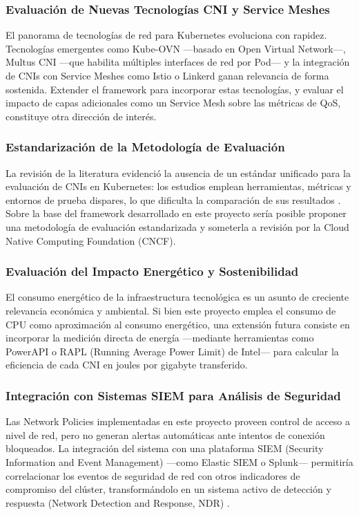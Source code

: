 \subsubsection{Evaluación de Nuevas Tecnologías CNI y Service Meshes}

El panorama de tecnologías de red para Kubernetes evoluciona con rapidez. Tecnologías emergentes como Kube-OVN ---basado en Open Virtual Network---, Multus CNI ---que habilita múltiples interfaces de red por Pod--- y la integración de CNIs con Service Meshes como Istio o Linkerd ganan relevancia de forma sostenida. Extender el framework para incorporar estas tecnologías, y evaluar el impacto de capas adicionales como un Service Mesh sobre las métricas de QoS, constituye otra dirección de interés.

\subsubsection{Estandarización de la Metodología de Evaluación}

La revisión de la literatura evidenció la ausencia de un estándar unificado para la evaluación de CNIs en Kubernetes: los estudios emplean herramientas, métricas y entornos de prueba dispares, lo que dificulta la comparación de sus resultados \cite{ref7,ref8}. Sobre la base del framework desarrollado en este proyecto sería posible proponer una metodología de evaluación estandarizada y someterla a revisión por la Cloud Native Computing Foundation (CNCF).

\subsubsection{Evaluación del Impacto Energético y Sostenibilidad}

El consumo energético de la infraestructura tecnológica es un asunto de creciente relevancia económica y ambiental. Si bien este proyecto emplea el consumo de CPU como aproximación al consumo energético, una extensión futura consiste en incorporar la medición directa de energía ---mediante herramientas como PowerAPI o RAPL (Running Average Power Limit) de Intel--- para calcular la eficiencia de cada CNI en joules por gigabyte transferido.

\subsubsection{Integración con Sistemas SIEM para Análisis de Seguridad}

Las Network Policies implementadas en este proyecto proveen control de acceso a nivel de red, pero no generan alertas automáticas ante intentos de conexión bloqueados. La integración del sistema con una plataforma SIEM (Security Information and Event Management) ---como Elastic SIEM o Splunk--- permitiría correlacionar los eventos de seguridad de red con otros indicadores de compromiso del clúster, transformándolo en un sistema activo de detección y respuesta (Network Detection and Response, NDR) \cite{ref27}.
